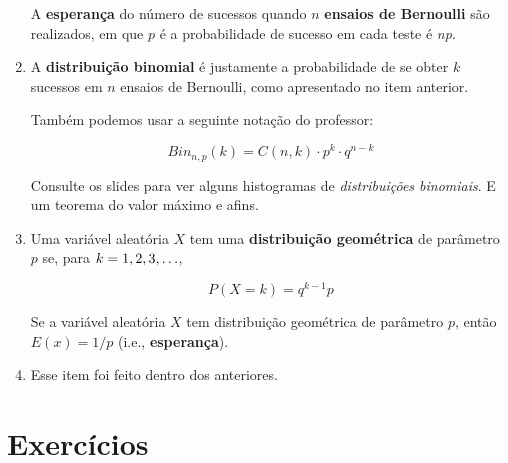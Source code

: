 \documentclass{article}
\begin{document}
\begin{enumerate}
        A \textbf{esperança} do número de sucessos quando \( n \) \textbf{ensaios de Bernoulli} são realizados, em que \( p \) é a probabilidade de sucesso em cada teste é \textit{np}.

    \item A \textbf{distribuição binomial} é justamente a probabilidade de se obter \( k \) sucessos em \( n \) ensaios de Bernoulli, como apresentado no item anterior.

        Também podemos usar a seguinte notação do professor: 

        \[ Bin_{n,p}(k) = C(n,k) \cdot p^{k} \cdot q^{n-k} \]


        Consulte os slides para ver alguns histogramas de \textit{distribuições binomiais}. E um teorema do valor máximo e afins.

    \item Uma variável aleatória \( X \) tem uma \textbf{distribuição geométrica} de parâmetro \( p \) se, para \( k = 1,2,3, \mathellipsis \),

        \[ P(X = k) = q^{k-1}p \]

        Se a variável aleatória \( X \) tem distribuição geométrica de parâmetro \( p \), então \( E(x) = 1/p\) (i.e., \textbf{esperança}).

    \item Esse item foi feito dentro dos anteriores.

\end{enumerate}
\newpage
\section*{Exercícios}
\end{document}
